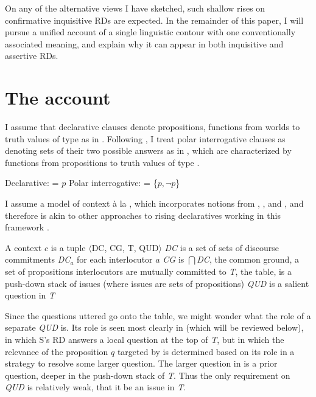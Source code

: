 \documentclass[output=paper,colorlinks,citecolor=brown]{langscibook}
\begin{document}
	On any of the alternative views I have sketched, such shallow rises on confirmative inquisitive RDs are expected. In the remainder of this paper, I will pursue a unified account of a single linguistic contour \rise with one conventionally associated meaning, and explain why it can appear in both inquisitive and assertive RDs.
	
	
	
	
	
	
\section{The account} \label{account}
	
	I assume that declarative clauses denote propositions, functions from worlds to truth values of type  as in . Following \citet{hamblin73}, I treat polar interrogative clauses as denoting sets of their two possible answers as in , which are characterized by functions from propositions to truth values of type . 
	
	\exa
	\ea \label{dec}Declarative: \den{\phi}{} = $p$
	\ex \label{pol}Polar interrogative:  = \{$p, \neg p$\} 
	\z
	\z
	
	I assume a model of context \`a la \citet{farkas10}, which incorporates notions from \citet{hamblin71}, \citet{stalnaker78}, and \citet{roberts12}, and therefore is akin to other approaches to rising declaratives working in this framework \citep[e.g.][]{gunlogson03, gunlogson08, malamud15, farkas17, jeong18, rudin18, rudin22}. 
	
	\exa \label{con}A context $c$ is a tuple $\langle$DC, CG, T, QUD$\rangle$ 
	\ea \emph{DC} is a set of sets of discourse commitments \emph{DC}$_{a}$ for each interlocutor $a$
	\ex \emph{CG} is $\bigcap$\emph{DC}, the common ground, a set of propositions interlocutors are mutually committed to 
	\ex \emph{T}, the table, is a push-down stack of issues (where issues are sets of propositions) 
	\ex \emph{QUD} is a  salient question in \emph{T} \label{qud}
	\z
	\z
	
	Since the questions uttered go onto the table, we might wonder what the role of a separate \emph{QUD} is. Its role is seen most clearly in  (which will be reviewed below), in which S's RD answers a local question at the top of \emph{T}, but in which the relevance of the proposition $q$ targeted by \rise is determined based on its role in a strategy to resolve some larger question. The larger question in  is a prior question, deeper in the push-down stack of \emph{T}. Thus the only requirement on \emph{QUD} is relatively weak, that it be an issue in \emph{T}. 
	
\end{document}
